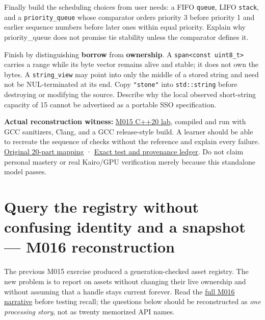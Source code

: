 Finally build the scheduling choices from user needs: a FIFO \texttt{queue}, LIFO \texttt{stack}, and a \texttt{priority\_queue} whose comparator orders priority 3 before priority 1 and earlier sequence numbers before later ones within equal priority. Explain why priority\_queue does not promise tie stability unless the comparator defines it.

Finish by distinguishing \textbf{borrow} from \textbf{ownership}. A \texttt{span\textless{}const\ uint8\_t\textgreater{}} carries a range while its byte vector remains alive and stable; it does not own the bytes. A \texttt{string\_view} may point into only the middle of a stored string and need not be NUL-terminated at its end. Copy \texttt{"stone"} into \texttt{std::string} before destroying or modifying the source. Describe why the local observed short-string capacity of 15 cannot be advertised as a portable SSO specification.

\textbf{Actual reconstruction witness:} \href{tools/labs/asset_container_lab.cpp}{M015 C++20 lab}, compiled and run with GCC sanitizers, Clang, and a GCC release-style build. A learner should be able to recreate the sequence of checks without the reference and explain every failure. \hyperref[appendix-fd090d982a15-m015-parts-231250-growing-the-asset-registry-without-losing-identities]{Original 20-part mapping} · \hyperref[appendix-a103e7846d21-phase-5-additive-reconstruction-m015-parts-231250]{Exact test and provenance ledger}. Do not claim personal mastery or real Kairo/GPU verification merely because this standalone model passes.

\section{Query the registry without confusing identity and a snapshot --- M016 reconstruction}\label{appendix-960160274237-query-the-registry-without-confusing-identity-and-a-snapshot-m016-reconstruction}

The previous M015 exercise produced a generation-checked asset registry. The new problem is to report on assets without changing their live ownership and without assuming that a handle stays current forever. Read the \href{Continuous\%20Notes/Computing\%20Foundations\%20-\%20From\%20Bits\%20to\%20C++\%20and\%20Systems\%20APIs\#From\%20a\%20living\%20asset\%20registry\%20to\%20reliable\%20queries\%20and\%20transformations}{full M016 narrative} before testing recall; the questions below should be reconstructed as \emph{one processing story}, not as twenty memorized API names.

